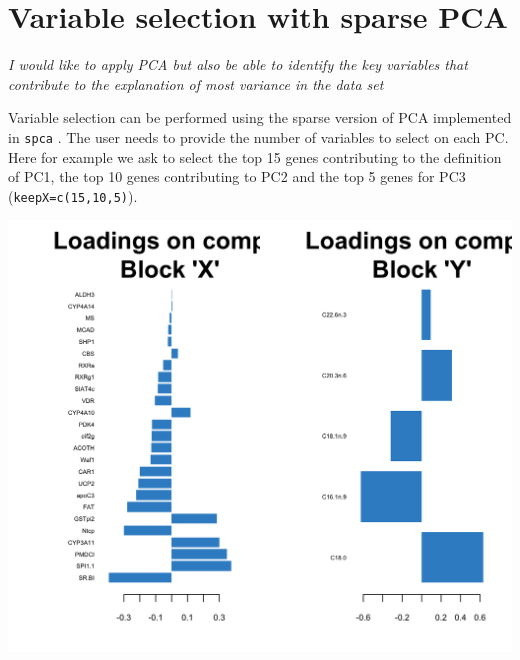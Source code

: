 \documentclass[]{book}
\newenvironment{Shaded}{\begin{snugshade}}{\end{snugshade}}
\newcommand{\KeywordTok}[1]{\textcolor[rgb]{0.13,0.29,0.53}{\textbf{#1}}}
\newcommand{\DataTypeTok}[1]{\textcolor[rgb]{0.13,0.29,0.53}{#1}}
\newcommand{\DecValTok}[1]{\textcolor[rgb]{0.00,0.00,0.81}{#1}}
\newcommand{\StringTok}[1]{\textcolor[rgb]{0.31,0.60,0.02}{#1}}
\newcommand{\CommentTok}[1]{\textcolor[rgb]{0.56,0.35,0.01}{\textit{#1}}}
\newcommand{\OtherTok}[1]{\textcolor[rgb]{0.56,0.35,0.01}{#1}}
\newcommand{\OperatorTok}[1]{\textcolor[rgb]{0.81,0.36,0.00}{\textbf{#1}}}
\newcommand{\NormalTok}[1]{#1}
\theoremstyle{definition}
\theoremstyle{definition}
\theoremstyle{definition}
\theoremstyle{remark}
\begin{document}
\section{Variable selection with sparse PCA}\label{sPCA}

{ \emph{I would like to apply PCA but also be able to identify the key
variables that contribute to the explanation of most variance in the
data set} }

Variable selection can be performed using the sparse version of PCA
implemented in \texttt{spca} \citep{She08}. The user needs to provide
the number of variables to select on each PC. Here for example we ask to
select the top 15 genes contributing to the definition of PC1, the top
10 genes contributing to PC2 and the top 5 genes for PC3
(\texttt{keepX=c(15,10,5)}).

\begin{Shaded}
\end{Shaded}

\begin{center}\includegraphics[width=0.5\linewidth]{Figures/unnamed-chunk-10-1} \end{center}
\end{document}
